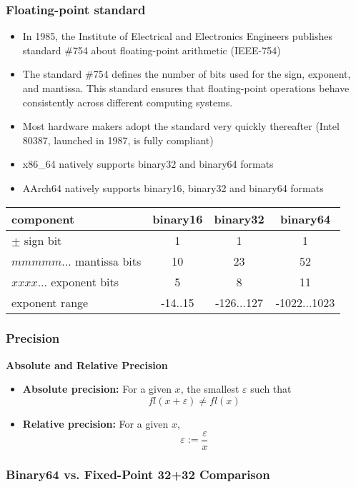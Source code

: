 \documentclass[12pt]{article}
\begin{document}
\subsubsection{Floating-point standard}
\begin{itemize}
    \item In 1985, the Institute of Electrical and Electronics Engineers publishes standard \#754 about floating-point arithmetic (IEEE-754)
    \item The standard \#754 defines the number of bits used for the sign, exponent, and mantissa. This standard ensures that floating-point operations behave consistently across different computing systems.
    \item Most hardware makers adopt the standard very quickly thereafter (Intel 80387, launched in 1987, is fully compliant)
    \item x86\_64 natively supports binary32 and binary64 formats
    \item AArch64 natively supports binary16, binary32 and binary64 formats
\end{itemize}

\begin{tabular}{lccc}
    component & binary16 & binary32 & binary64 \\
    \hline
    $\pm$ sign bit & 1 & 1 & 1 \\
    $mmmmm...$ mantissa bits & 10 & 23 & 52 \\
    $xxxx...$ exponent bits & 5 & 8 & 11 \\
    exponent range & -14..15 & -126...127 & -1022...1023 \\
\end{tabular}

\subsubsection{Precision}

\textbf{Absolute and Relative Precision}
\begin{itemize}
    \item \textbf{Absolute precision:} For a given \(x\), the smallest \( \varepsilon \) such that
    \[
        fl(x + \varepsilon) \neq fl(x)
    \]

    \item \textbf{Relative precision:} For a given \(x\),
    \[
        \varepsilon := \frac{\varepsilon}{x}
    \]
\end{itemize}

\subsubsection{Binary64 vs. Fixed-Point 32+32 Comparison}
\end{document}
